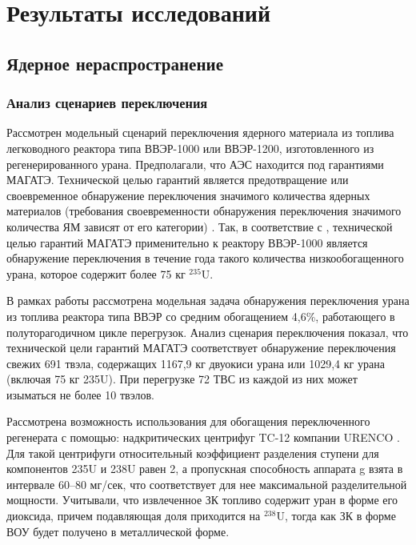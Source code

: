 \chapter{Результаты исследований}\label{ch:ch1}

\section{Ядерное нераспространение}\label{sec:ch1/sec1}
\subsection{Анализ сценариев переключения}\label{sec:ch1/sec1.1}

Рассмотрен модельный сценарий переключения ядерного материала из топлива легководного реактора типа ВВЭР-1000 или ВВЭР-1200,  изготовленного из регенерированного урана. Предполагали, что АЭС находится под гарантиями МАГАТЭ. Технической целью гарантий является предотвращение или своевременное обнаружение переключения значимого количества ядерных материалов (требования своевременности обнаружения переключения значимого количества ЯМ зависят от  его категории) \cite{bumblis}. Так, в соответствие с \cite{bumblis}, технической целью гарантий МАГАТЭ применительно к реактору ВВЭР-1000 является обнаружение переключения в течение года такого количества низкообогащенного урана, которое содержит более 75 кг $^{235}$U.

В рамках работы рассмотрена модельная задача обнаружения переключения урана из топлива реактора типа ВВЭР со средним обогащением 4,6\%, работающего в полуторагодичном цикле перегрузок. Анализ сценария переключения показал, что технической цели гарантий МАГАТЭ соответствует обнаружение переключения свежих 691 твэла, содержащих 1167,9 кг двуокиси урана или 1029,4 кг урана (включая 75 кг 235U). При перегрузке 72 ТВС из каждой из них может изыматься не более 10 твэлов.

Рассмотрена возможность использования для обогащения переключенного регенерата с помощью:  надкритических центрифуг TC-12 компании URENCO \cite{Borisevich2014}. Для такой центрифуги относительный коэффициент разделения ступени для компонентов 235U и 238U равен 2, а пропускная способность аппарата g взята в интервале 60–80 мг/сек, что соответствует для нее максимальной разделительной мощности. Учитывали, что извлеченное ЗК топливо содержит уран в форме его диоксида, причем подавляющая доля приходится на  $^{238}$U, тогда как ЗК в форме ВОУ будет получено в металлической форме. 

